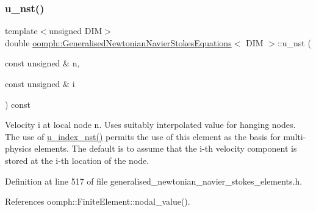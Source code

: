 \mbox{\label{classoomph_1_1GeneralisedNewtonianNavierStokesEquations_a5c069c40584270d7b7b3522fbab33fd0}} 
\subsubsection{\texorpdfstring{u\+\_\+nst()}{u\_nst()}\hspace{0.1cm}{\footnotesize\ttfamily [1/2]}}
{\footnotesize\ttfamily template$<$unsigned D\+IM$>$ \\
double \hyperlink{classoomph_1_1GeneralisedNewtonianNavierStokesEquations}{oomph\+::\+Generalised\+Newtonian\+Navier\+Stokes\+Equations}$<$ D\+IM $>$\+::u\+\_\+nst (\begin{DoxyParamCaption}\item[{const unsigned \&}]{n,  }\item[{const unsigned \&}]{i }\end{DoxyParamCaption}) const\hspace{0.3cm}{\ttfamily [inline]}}



Velocity i at local node n. Uses suitably interpolated value for hanging nodes. The use of \hyperlink{classoomph_1_1GeneralisedNewtonianNavierStokesEquations_a3d3e311b51c9258280c0f65d55581a3e}{u\+\_\+index\+\_\+nst()} permits the use of this element as the basis for multi-\/physics elements. The default is to assume that the i-\/th velocity component is stored at the i-\/th location of the node. 



Definition at line 517 of file generalised\+\_\+newtonian\+\_\+navier\+\_\+stokes\+\_\+elements.\+h.



References oomph\+::\+Finite\+Element\+::nodal\+\_\+value().

\mbox{\label{classoomph_1_1GeneralisedNewtonianNavierStokesEquations_ab025c2ddf55b0c4901eb070077ee2a3a}} 
